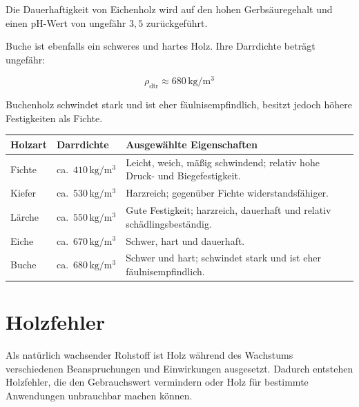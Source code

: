 \documentclass[
  12pt,
  a4paper,
  oneside
]{scrreprt}
\begin{document}
Die Dauerhaftigkeit von Eichenholz wird auf den hohen Gerbsäuregehalt
und einen pH-Wert von ungefähr $3{,}5$ zurückgeführt. 

Buche ist ebenfalls ein schweres und hartes Holz. Ihre Darrdichte
beträgt ungefähr:

\begin{equation}
  \rho_{\mathrm{dtr}} \approx 680\,\mathrm{kg/m^3}
\end{equation}

Buchenholz schwindet stark und ist eher fäulnisempfindlich, besitzt
jedoch höhere Festigkeiten als Fichte. 

\begin{longtable}{
  >{\raggedright\arraybackslash}p{}
  >{\centering\arraybackslash}p{}
  >{\raggedright\arraybackslash}p{}
}
\toprule
\textbf{Holzart} &
\textbf{Darrdichte} &
\textbf{Ausgewählte Eigenschaften} \\
\midrule
\endhead

Fichte &
ca.\ $410\,\mathrm{kg/m^3}$ &
Leicht, weich, mäßig schwindend; relativ hohe Druck- und
Biegefestigkeit. \\

Kiefer &
ca.\ $530\,\mathrm{kg/m^3}$ &
Harzreich; gegenüber Fichte widerstandsfähiger. \\

Lärche &
ca.\ $550\,\mathrm{kg/m^3}$ &
Gute Festigkeit; harzreich, dauerhaft und relativ schädlingsbeständig. \\

Eiche &
ca.\ $670\,\mathrm{kg/m^3}$ &
Schwer, hart und dauerhaft. \\

Buche &
ca.\ $680\,\mathrm{kg/m^3}$ &
Schwer und hart; schwindet stark und ist eher fäulnisempfindlich. \\

\bottomrule
\end{longtable}



\section{Holzfehler}

Als natürlich wachsender Rohstoff ist Holz während des Wachstums
verschiedenen Beanspruchungen und Einwirkungen ausgesetzt. Dadurch
entstehen Holzfehler, die den Gebrauchswert vermindern oder Holz für
bestimmte Anwendungen unbrauchbar machen können. 
\end{document}
